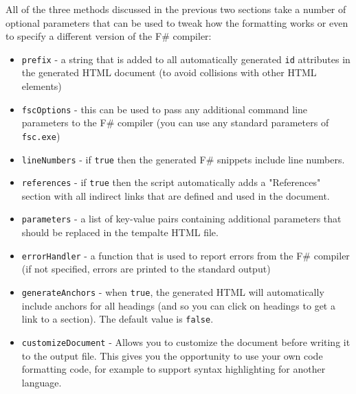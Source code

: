 \documentclass{article}
\begin{document}
All of the three methods discussed in the previous two sections take a number of optional
parameters that can be used to tweak how the formatting works or even to specify a different
version of the F\# compiler:
\begin{itemize}
\item \texttt{prefix} - a string that is added to all automatically generated \texttt{id} attributes
in the generated HTML document (to avoid collisions with other HTML elements)

\item \texttt{fscOptions} - this can be used to pass any additional command line 
parameters to the F\# compiler (you can use any standard parameters of \texttt{fsc.exe})

\item \texttt{lineNumbers} - if \texttt{true} then the generated F\# snippets include line numbers.

\item \texttt{references} - if \texttt{true} then the script automatically adds a "References" 
section with all indirect links that are defined and used in the document.

\item \texttt{parameters} - a list of key-value pairs containing additional parameters
that should be replaced in the tempalte HTML file.

\item \texttt{errorHandler} - a function that is used to report errors from the F\# compiler 
(if not specified, errors are printed to the standard output)

\item \texttt{generateAnchors} - when \texttt{true}, the generated HTML will automatically include
anchors for all headings (and so you can click on headings to get a link
to a section). The default value is \texttt{false}.

\item \texttt{customizeDocument} - Allows you to customize the document before writing it 
to the output file. This gives you the opportunity to use your own
code formatting code, for example to support syntax highlighting for another language.

\end{itemize}
\end{document}
